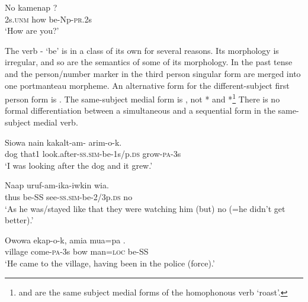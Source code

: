 \ea%
\label{ex:3:x499}
\gll No kamenap ? \\
2s.\textsc{unm} how be-Np-\textsc{pr}.2s\\
\glt`How are you?' 
\z

The verb - `be' is in a class of its own for several reasons. Its morphology is irregular, and so are the semantics of some of its morphology. In  the past tense and the person/number marker in the third person singular form are merged into one portmanteau morpheme. An alternative form for the different-subject first person form  is  . The same-subject medial form is  , not * and *\footnote{ and  are the same subject medial forms of the homophonous verb  `roast'.} There is no formal differentiation between a simultaneous  and a sequential  form in the same-subject medial verb. 

\ea%
\label{ex:3:x1931}
\gll Siowa nain kakalt-am-\textstyleEmphasizedVernacularWords{-} arim-o-k. \\
dog that1 look.after-\textsc{ss}.\textsc{sim}-be-1s/p.\textsc{ds} grow-\textsc{pa}-3s\\
\glt`I was looking after the dog and it grew.'
\z

\ea%
\label{ex:3:x260}
\gll Naap  uruf-am-ika-iwkin wia. \\
thus be-SS see-\textsc{ss}.\textsc{sim}-be-2/3p.\textsc{ds} no\\
\glt`As he was/stayed like that they were watching him (but) no (=he didn't get better).' 
\z

\ea%
\label{ex:3:x262}
\gll Owowa ekap-o-k, amia mua=pa . \\
village come-\textsc{pa}-3s bow man=\textsc{loc} be-SS \\
\glt`He came to the village, having been in the police (force).'
\z

